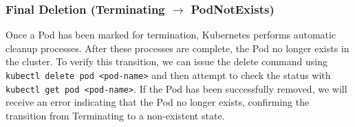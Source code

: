 \documentclass[main.tex]{subfiles}
\begin{document}
\subsubsection{Final Deletion (Terminating $\rightarrow$ PodNotExists)}
Once a Pod has been marked for termination, Kubernetes performs automatic cleanup processes. After these processes are complete, the Pod no longer exists in the cluster. To verify this transition, we can issue the delete command using \texttt{kubectl delete pod <pod-name>} and then attempt to check the status with \texttt{kubectl get pod <pod-name>}. If the Pod has been successfully removed, we will receive an error indicating that the Pod no longer exists, confirming the transition from Terminating to a non-existent state.
\end{document}
